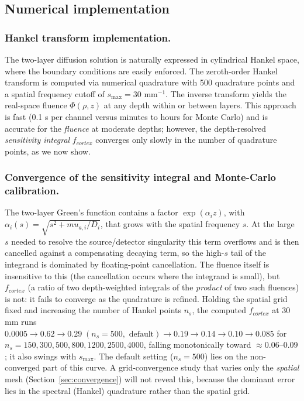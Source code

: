 \documentclass[11pt]{article}
\def\mu{mu}%
\def\mathrm#1{#1}%
\def\,{ }%
\begin{document}
\subsection{Numerical implementation}
\label{sec:numerical}

\subsubsection{Hankel transform implementation.}
The two-layer diffusion solution is naturally expressed in cylindrical Hankel space, where the boundary conditions are easily enforced. The zeroth-order Hankel transform is computed via numerical quadrature with 500 quadrature points and a spatial frequency cutoff of $s_{\max} = 30$\,mm$^{-1}$. The inverse transform yields the real-space fluence $\Phi(\rho, z)$ at any depth within or between layers. This approach is fast (0.1\,s per channel versus minutes to hours for Monte Carlo) and is accurate for the \emph{fluence} at moderate depths; however, the depth-resolved \emph{sensitivity integral} $f_{\mathrm{cortex}}$ converges only slowly in the number of quadrature points, as we now show.

\subsubsection{Convergence of the sensitivity integral and Monte-Carlo calibration.}
\label{sec:hankel_instab}
The two-layer Green's function contains a factor $\exp(\alpha_i z)$, with $\alpha_i(s)=\sqrt{s^2+\mu_{a,i}/D_i}$, that grows with the spatial frequency $s$. At the large $s$ needed to resolve the source/detector singularity this term overflows and is then cancelled against a compensating decaying term, so the high-$s$ tail of the integrand is dominated by floating-point cancellation. The fluence itself is insensitive to this (the cancellation occurs where the integrand is small), but $f_{\mathrm{cortex}}$ (a ratio of two depth-weighted integrals of the \emph{product} of two such fluences) is not: it fails to converge as the quadrature is refined. Holding the spatial grid fixed and increasing the number of Hankel points $n_s$, the computed $f_{\mathrm{cortex}}$ at 30\,mm runs $0.0005 \to 0.62 \to 0.29\;(n_s{=}500,\text{ default}) \to 0.19 \to 0.14 \to 0.10 \to 0.085$ for $n_s = 150, 300, 500, 800, 1200, 2500, 4000$, falling monotonically toward $\approx 0.06$--$0.09$; it also swings with $s_{\max}$. The default setting ($n_s = 500$) lies on the non-converged part of this curve. A grid-convergence study that varies only the \emph{spatial} mesh (Section~\ref{sec:convergence}) will not reveal this, because the dominant error lies in the spectral (Hankel) quadrature rather than the spatial grid.
\end{document}
